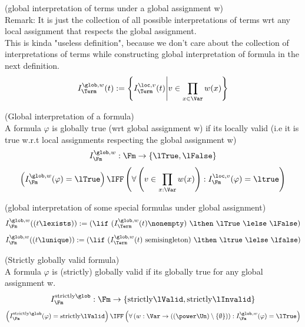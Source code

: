 \begin{definition}(global interpretation of terms under a global assignment w)\\
Remark: It is just the collection of all possible interpretations of terms wrt any local assignment that respects the global assignment.\\
This is kinda "useless definition", because we don't care about the collection of interpretations of terms while constructing global interpretation of formula in the next definition.
\[
I^{\glob,w}_\Term(t) := \left\{I^{\loc,v}_\Term(t) \middle| v\in \prod_{x\in\Var}w(x) \right\}
\]
\end{definition}
\begin{definition}(Global interpretation of a formula)\\
A formula $\varphi$ is globally true (wrt global assignment w) if its locally valid (i.e it is true w.r.t local assignments respecting the global assignment w)
\[
I^{\glob,w}_\Fm : \Fm \to \{\lTrue, \lFalse\}
\]
\[
\left(I^{\glob,w}_\Fm(\varphi)=\lTrue\right) \IFF \left(\forall \left(v\in\prod_{x:\Var}w(x)\right):I^{\loc,v}_\Fm(\varphi)=\ltrue\right)
\]
\end{definition}
\begin{example}(global interpretation of some special formulas under global assignment)
\[
I^{\glob,w}_\Fm((t\lexists)) := (\lif\ (I^{\glob,w}_\Term(t)\nonempty)\ \lthen\ \lTrue\ \lelse\ \lFalse)
\]
\[
I^{\glob,w}_\Fm((t\lunique)) := (\lif\ (I^{\glob,w}_\Term(t)\mbox{ semisingleton})\ \lthen\ \ltrue\ \lelse\ \lfalse)
\]
\end{example}
\begin{definition}(Strictly globally valid formula)\\%
A formula $\varphi$ is (strictly) globally valid if its globally true for any global assignment w.
\[
I^{\mathrm{strictly}\glob}_\Fm : \Fm \to \{\mathrm{strictly}\lValid,\mathrm{strictly}\lInvalid\}
\]
\[
\left(I^{\mathrm{strictly}\glob}_\Fm(\varphi)=\mathrm{strictly}\lValid\right) \IFF
 \left(\forall \left(w:\Var\to((\power\Un)\setminus\{\emptyset\})\right):I^{\glob,w}_\Fm(\varphi)=\lTrue\right)
\]
\end{definition}
